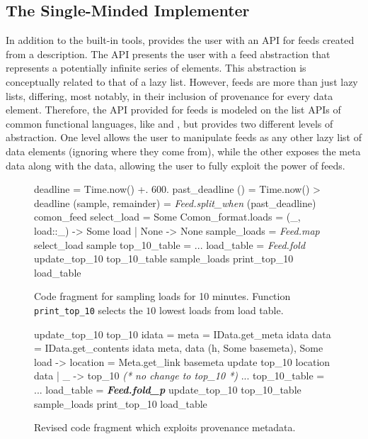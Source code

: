 

\subsection{The Single-Minded Implementer}

In addition to the built-in tools, \padsd{} provides the user with an API for feeds created from a description. The API presents the user with a feed abstraction that represents a potentially infinite series of elements. This abstraction is conceptually related to that of a lazy list. However, feeds are more than just lazy lists, differing, most notably, in their inclusion of provenance for every data element. Therefore, the API provided for feeds is modeled on the list APIs of common functional languages, like \ocaml and \haskell, but provides two different levels of abstraction. One level allows the user to manipulate feeds as any other lazy list of data elements (ignoring where they come from), while the other exposes the meta data along with the data, allowing the user to fully exploit the power of feeds.


\begin{figure}[tb]
\centering
\begin{codebox}
 deadline = Time.now() +. 600. 
 past_deadline () = Time.now() > deadline 
 (sample, remainder) = 
   \textit{Feed.split_when} (past_deadline) comon_feed 
 select_load = 
    Some {Comon_format.loads = (_, load::_)} -> Some load
  | None -> None 
 sample_loads = \textit{Feed.map} select_load sample 
 top_10_table = ... 
 load_table = \textit{Feed.fold} update_top_10 
   top_10_table sample_loads 
 print_top_10 load_table
\end{codebox}
  \caption{Code fragment for sampling \planetlab loads for 10 minutes. Function \texttt{print\_top\_10} selects the $10$ lowest loads from load table.}
\label{fig:sample-loads}
\end{figure}

\begin{figure}[tb]
\centering
\begin{codebox}
 update_top_10 top_10 idata =
   meta = IData.get_meta idata 
   data = IData.get_contents idata 
   meta, data  
    (h, Some basemeta), Some load ->
       location = Meta.get_link basemeta 
      update top_10 location data
  | _ -> top_10 \textit{ (* no change to top_10 *)}
   ...
 top_10_table = ... 
 load_table = \textit{\textbf{Feed.fold_p}} update_top_10 
   top_10_table sample_loads
 print_top_10 load_table
\end{codebox}
  \caption{Revised code fragment which exploits provenance metadata. }
\label{fig:sample-loads-prov}
\end{figure}

